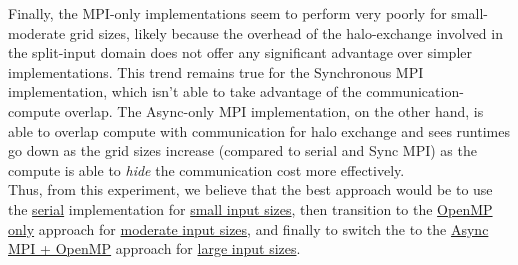 \documentclass[a4paper,10pt]{article}
\begin{document}
\begin{multicols}{2}
Finally, the MPI-only implementations seem to perform very poorly for small-moderate grid sizes, likely because the overhead of the halo-exchange involved in the split-input domain does not offer any significant advantage over simpler implementations. This trend remains true for the Synchronous MPI implementation, which isn't able to take advantage of the communication-compute overlap. The Async-only MPI implementation, on the other hand, is able to overlap compute with communication for halo exchange and sees runtimes go down as the grid sizes increase (compared to serial and Sync MPI) as the compute is able to \textit{hide} the communication cost more effectively. \\

Thus, from this experiment, we believe that the best approach would be to use the \underline{serial} implementation for \underline{small input sizes}, then transition to the \underline{OpenMP only} approach for \underline{moderate input sizes}, and finally to switch the to the \underline{Async MPI + OpenMP} approach for \underline{large input sizes}. 
\end{multicols}
\end{document}
